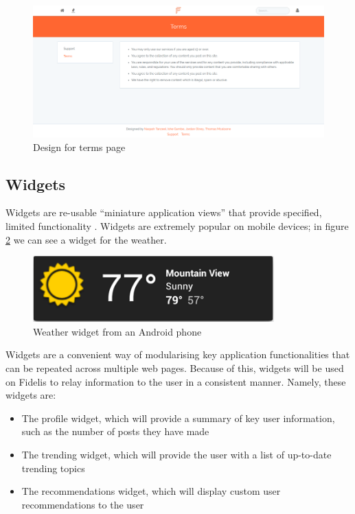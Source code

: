 \begin{figure}[H]
\centering
\includegraphics[height=2in]{Images/Design/terms-page}
\caption{Design for terms page}
\label{fig:terms}
\end{figure}

\subsection{Widgets}
Widgets are re-usable ``miniature application views'' that provide specified, limited functionality \cite{AndroidDevelopers:Widgets}. Widgets are extremely popular on mobile devices; in figure \ref{fig:WeatherWidget} we can see a widget for the weather. 

\begin{figure}[H]
\centering
\includegraphics[height=1in]{Images/Design/AppWidget}
\caption{Weather widget from an Android phone}
\label{fig:WeatherWidget}
\end{figure}

Widgets are a convenient way of modularising key application functionalities that can be repeated across multiple web pages. Because of this, widgets will be used on Fidelis to relay information to the user in a consistent manner. Namely, these widgets are:

\begin{itemize}
\item The profile widget, which will provide a summary of key user information, such as the number of posts they have made
\item The trending widget, which will provide the user with a list of up-to-date trending topics
\item The recommendations widget, which will display custom user recommendations to the user
\end{itemize}

